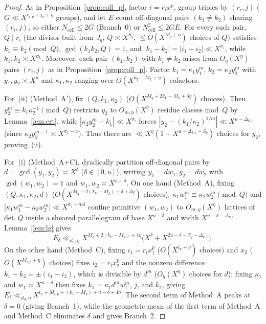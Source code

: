 \documentclass[11pt,a4paper]{amsart}
\theoremstyle{plain}
\theoremstyle{definition}
\theoremstyle{remark}
\begin{document}
\begin{proof}
As in Proposition~\ref{prop:coll_p}, factor $i = r_i x^p$, group triples by $(r_i, j)$ ($G \ll X^{r_{i,p}+j_V+\eta}$ groups), and let $E$ count off-diagonal pairs $(k_1 \neq k_2)$ sharing $(r_i, j)$, so either $N_{\mathrm{cell}} \le 2 G$ (Branch~0) or $N_{\mathrm{cell}}^2 \le 2 G E$. For every such pair, $Q \mid r_i$ (the divisor built from $J_q$, $Q \asymp X^{S_q}$, $\le O(X^{M_q+\eta})$ choices of $Q$) satisfies $k_1 \equiv k_2 \pmod Q$, $\gcd(k_1 k_2, Q) = 1$, and $|k_1 - k_2| = |i_1 - i_2| \ll X^{\sigma_i}$, while $k_1, k_2 \asymp X^{\sigma_k}$. Moreover, each pair $(k_1, k_2)$ with $k_1 \neq k_2$ arises from $O_\eta(X^\eta)$ pairs $(r_i, j)$ as in Proposition~\ref{prop:coll_p}. Factor $k_1 = \kappa_1 y_1^m$, $k_2 = \kappa_2 y_2^m$ with $y_1, y_2 \asymp X^u$ and $\kappa_1, \kappa_2$ ranging over $O(X^{k_V - M_k + \eta})$ cofactors.

For~(ii) (Method~A$'$), fix $(Q, k_1, \kappa_2)$ ($O(X^{M_q + 2 k_V - M_k + 3\eta})$ choices). Then $y_2^m \equiv k_1 \kappa_2^{-1} \pmod Q$ restricts $y_2$ to $O_{m,\eta}(X^\eta)$ residue classes mod~$Q$ by Lemma~\ref{lem:crt}, while $|\kappa_2 y_2^m - k_1| \ll X^{\sigma_i}$ forces $|y_2 - (k_1/\kappa_2)^{1/m}| \ll X^{u - \Delta_{k,i}}$ (since $\kappa_2 y_2^{m-1} \asymp X^{\sigma_k - u}$). Thus there are $\ll X^\eta(1 + X^{u - \Delta_{k,i} - S_q})$ choices for $y_2$, proving~(ii).

For~(i) (Method~A+C), dyadically partition off-diagonal pairs by $d = \gcd(y_1, y_2) \asymp X^\delta$ ($\delta \in [0, u]$), writing $y_1 = d w_1, y_2 = d w_2$ with $\gcd(w_1, w_2) = 1$ and $w_1, w_2 \asymp X^{u-\delta}$. On one hand (Method~A), fixing $(Q, \kappa_1, \kappa_2, d)$ ($O(X^{M_q + 2(k_V - M_k) + \delta + 3\eta})$ choices), $\kappa_1 w_1^m \equiv \kappa_2 w_2^m \pmod Q$ and $|\kappa_1 w_1^m - \kappa_2 w_2^m| \ll X^{\sigma_i - m\delta}$ confine primitive $(w_1, w_2)$ to $O_{m,\eta}(X^\eta)$ lattices of det~$Q$ inside a sheared parallelogram of base $X^{u-\delta}$ and width $X^{u-\delta - \Delta_{k,i}}$. Lemma~\ref{lem:lg} gives
\[
  E_\delta \ll_{d_0,\eta} X^{M_q + 2(k_V - M_k) + 4\eta}\bigl(X^\delta + X^{2u - \delta - S_q - \Delta_{k,i}}\bigr).
\]
On the other hand (Method~C), fixing $i_1 = r_i x_1^p$ ($O(X^{i_V+\eta})$ choices) and $x_2$ ($O(X^{M_{i,p}+\eta})$ choices) fixes $i_2 = r_i x_2^p$ and the nonzero difference $k_1 - k_2 = \pm(i_1 - i_2)$, which is divisible by $d^m$ ($O_\eta(X^\eta)$ choices for $d$); fixing $\kappa_1$ and $w_1 \asymp X^{u-\delta}$ then fixes $k_1 = \kappa_1 d^m w_1^m$, $j$, and $k_2$, giving $E_\delta \ll_{d_0,\eta} X^{i_V + M_{i,p} + (k_V - M_k) + u - \delta + 4\eta}$. The second term of Method~A peaks at $\delta = 0$ (giving Branch~1), while the geometric mean of the first term of Method~A and Method~C eliminates $\delta$ and gives Branch~2.
\end{proof}
\end{document}
